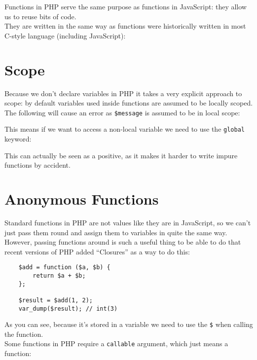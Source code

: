 Functions in PHP serve the same purpose as functions in JavaScript: they allow us to reuse bits of code.
\\

They are written in the same way as functions were historically written in most C-style language (including JavaScript):



\section{Scope}

Because we don't declare variables in PHP it takes a very explicit approach to scope: by default variables used inside functions are assumed to be locally scoped.
\\

The following will cause an error as \texttt{\$message} is assumed to be in local scope:


This means if we want to access a non-local variable we need to use the \texttt{global} keyword:


This can actually be seen as a positive, as it makes it harder to write impure functions by accident.


\section{Anonymous Functions}

Standard functions in PHP are not values like they are in JavaScript, so we can't just pass them round and assign them to variables in quite the same way. However, passing functions around is such a useful thing to be able to do that recent versions of PHP added ``Closures'' as a way to do this:

\begin{verbatim}
    $add = function ($a, $b) {
        return $a + $b;
    };

    $result = $add(1, 2);
    var_dump($result); // int(3)
\end{verbatim}

As you can see, because it's stored in a variable we need to use the \texttt{\$} when calling the function.
\\

Some functions in PHP require a \texttt{callable} argument, which just means a function:

